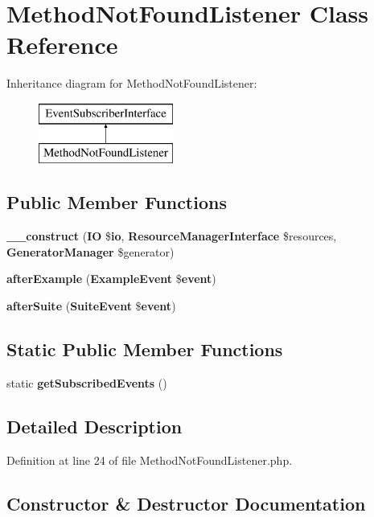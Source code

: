 \section{Method\+Not\+Found\+Listener Class Reference}
\label{class_php_spec_1_1_listener_1_1_method_not_found_listener}
Inheritance diagram for Method\+Not\+Found\+Listener\+:\begin{figure}[H]
\begin{center}
\leavevmode
\includegraphics[height=2.000000cm]{class_php_spec_1_1_listener_1_1_method_not_found_listener}
\end{center}
\end{figure}
\subsection*{Public Member Functions}
\begin{DoxyCompactItemize}
\item 
{\bf \+\_\+\+\_\+construct} ({\bf I\+O} \${\bf io}, {\bf Resource\+Manager\+Interface} \$resources, {\bf Generator\+Manager} \$generator)
\item 
{\bf after\+Example} ({\bf Example\+Event} \${\bf event})
\item 
{\bf after\+Suite} ({\bf Suite\+Event} \${\bf event})
\end{DoxyCompactItemize}
\subsection*{Static Public Member Functions}
\begin{DoxyCompactItemize}
\item 
static {\bf get\+Subscribed\+Events} ()
\end{DoxyCompactItemize}


\subsection{Detailed Description}


Definition at line 24 of file Method\+Not\+Found\+Listener.\+php.



\subsection{Constructor \& Destructor Documentation}
